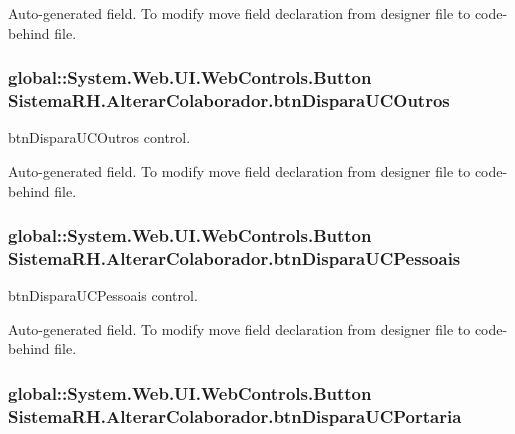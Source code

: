 Auto-\/generated field. To modify move field declaration from designer file to code-\/behind file. \hypertarget{class_sistema_r_h_1_1_alterar_colaborador_a113f7ebadce2409e1401d091ce62e3f1}{
\subsubsection[{btnDisparaUCOutros}]{\setlength{\rightskip}{0pt plus 5cm}global::System.Web.UI.WebControls.Button {\bf SistemaRH.AlterarColaborador.btnDisparaUCOutros}}}
\label{class_sistema_r_h_1_1_alterar_colaborador_a113f7ebadce2409e1401d091ce62e3f1}


btnDisparaUCOutros control. 

Auto-\/generated field. To modify move field declaration from designer file to code-\/behind file. \hypertarget{class_sistema_r_h_1_1_alterar_colaborador_a65c5bdcf85461b36a8387d636656d49f}{
\subsubsection[{btnDisparaUCPessoais}]{\setlength{\rightskip}{0pt plus 5cm}global::System.Web.UI.WebControls.Button {\bf SistemaRH.AlterarColaborador.btnDisparaUCPessoais}}}
\label{class_sistema_r_h_1_1_alterar_colaborador_a65c5bdcf85461b36a8387d636656d49f}


btnDisparaUCPessoais control. 

Auto-\/generated field. To modify move field declaration from designer file to code-\/behind file. \hypertarget{class_sistema_r_h_1_1_alterar_colaborador_ab67cd95a0a188f10c3767b9169433916}{
\subsubsection[{btnDisparaUCPortaria}]{\setlength{\rightskip}{0pt plus 5cm}global::System.Web.UI.WebControls.Button {\bf SistemaRH.AlterarColaborador.btnDisparaUCPortaria}}}
\label{class_sistema_r_h_1_1_alterar_colaborador_ab67cd95a0a188f10c3767b9169433916}


